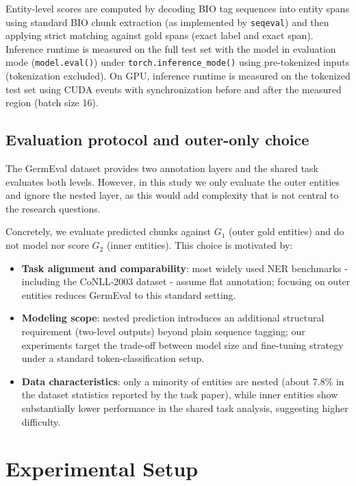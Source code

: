 \documentclass[11pt,a4paper,twocolumn]{article}
\begin{document}
Entity-level scores are computed by decoding BIO tag sequences into entity spans using standard BIO chunk extraction (as implemented by \texttt{seqeval}) and then applying strict matching against gold spans (exact label and exact span).
Inference runtime is measured on the full test set with the model in evaluation mode (\texttt{model.eval()}) under \texttt{torch.inference\_mode()} using pre-tokenized inputs (tokenization excluded). On GPU, inference runtime is measured on the tokenized test set using CUDA events with synchronization before and after the measured region (batch size 16).

\subsection{Evaluation protocol and outer-only choice}
The GermEval dataset provides two annotation layers and the shared task evaluates both levels.
However, in this study we only evaluate the outer entities and ignore the nested layer, as this would add complexity that is not central to the research questions.

Concretely, we evaluate predicted chunks against $G_1$ (outer gold entities) and do not model nor score $G_2$ (inner entities). This choice is motivated by:
\begin{itemize}
    \item \textbf{Task alignment and comparability}: most widely used NER benchmarks - including the CoNLL-2003 dataset \cite{tjong_kim_sang_introduction_2003} - assume flat annotation; focusing on outer entities reduces GermEval to this standard setting.
    \item \textbf{Modeling scope}: nested prediction introduces an additional structural requirement (two-level outputs) beyond plain sequence tagging; our experiments target the trade-off between model size and fine-tuning strategy under a standard token-classification setup.
    \item \textbf{Data characteristics}: only a minority of entities are nested (about 7.8\% in the dataset statistics reported by the task paper), while inner entities show substantially lower performance in the shared task analysis, suggesting higher difficulty. \cite{benikova_germeval_nodate}
\end{itemize}

\section{Experimental Setup}
\label{sec:experimental_setup}
\end{document}
